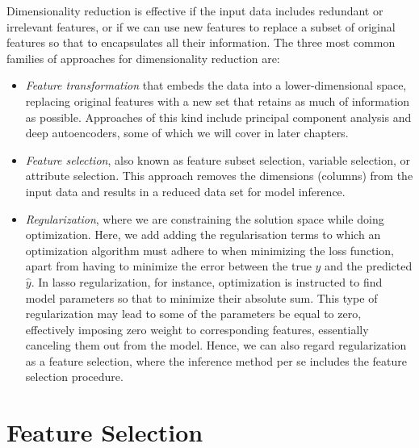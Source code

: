 \begin{refsection}
Dimensionality reduction is effective if the input data includes redundant or irrelevant features, or if we can use new features to replace a subset of original features so that to encapsulates all their information. The three most common families of approaches for dimensionality reduction are:
\begin{itemize}
\item {\em Feature transformation} that embeds the data into a lower-dimensional space, replacing original features with a new set that retains as much of information as possible. Approaches of this kind include principal component analysis and deep autoencoders, some of which we will cover in later chapters.
\item {\em Feature selection}, also known as feature subset selection, variable selection, or attribute selection. This approach removes the dimensions (\eg columns) from the input data and results in a reduced data set for model inference.
\item {\em Regularization}, where we are constraining the solution space while doing optimization. Here, we add adding the regularisation terms to which an optimization algorithm must adhere to when minimizing the loss function, apart from having to minimize the error between the true $y$ and the predicted $\hat{y}$. In lasso regularization, for instance, optimization is instructed to find model parameters so that to minimize their absolute sum. This type of regularization may lead to some of the parameters be equal to zero, effectively imposing zero weight to corresponding features, essentially canceling them out from the model. Hence, we can also regard regularization as a feature selection, where the inference method per se includes the feature selection procedure.
\end{itemize}


\section{Feature Selection}



\end{refsection}
